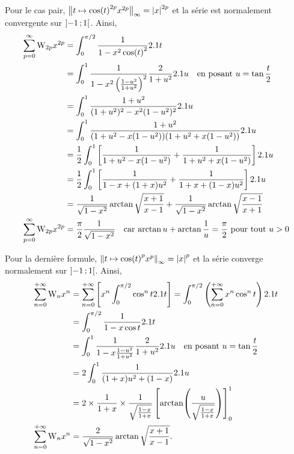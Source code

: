 \begin{solution}
\begin{reponses}
\item Pour le cas pair, $\big\Vert t \mapsto \cos(t)^{2p} x^{2p} \big\Vert_{\infty} = \abs{x}^{2p}$ et la série est normalement convergente sur $\left]-1\,;1\right[$. Ainsi,
\begin{align*}
\sum_{p=0}^\infty \mathrm{W}_{2p} x^{2p} &= \int_0^{\pi/2} \frac{1}{1 - x^2 \cos(t)^2} 2.1 t \\
&= \int_0^1 \frac{1}{1 - x^2 \left(\frac{1-u^2}{1+u^2}\right)^2} \frac{2}{1 + u^2} 2.1 u \quad \text{en posant } u = \tan \frac{t}{2} \\
&= \int_0^1 \frac{1 + u^2}{(1 + u^2)^2 - x^2(1-u^2)^2} 2.1 u \\
&= \int_0^1 \frac{1 + u^2}{(1 + u^2 - x(1-u^2))(1 + u^2 + x(1-u^2))} 2.1 u \\
&= \frac{1}{2} \int_0^1 \left[ \frac{1}{1 + u^2 - x(1-u^2)} + \frac{1}{1 + u^2 + x(1-u^2)}\right] 2.1 u \\
&= \frac{1}{2} \int_0^1 \left[\frac{1}{1 - x + (1+x)u^2} + \frac{1}{1 + x + (1-x)u^2} \right] 2.1 u \\
&= \frac{1}{\sqrt{1-x^2}} \arctan \sqrt{\frac{x+1}{x-1}} + \frac{1}{\sqrt{1-x^2}} \arctan \sqrt{\frac{x-1}{x+1}}\\
\sum_{p=0}^\infty \mathrm{W}_{2p} x^{2p} &= \frac{\pi}{2} \frac{1}{\sqrt{1-x^2}} \quad \text{car $\arctan u + \arctan \frac{1}{u} = \frac{\pi}{2}$ pour tout $u > 0$}
\end{align*}

\item Pour la dernière formule, $\norm{t \mapsto \cos(t)^p x^p}_{\infty} = \left| x \right|^p$ et la série converge normalement sur $\left]-1\,;1\right[$. Ainsi,
\begin{align*}
\sum_{n=0}^{+ \infty} \mathrm{W}_n x^n &= \sum_{n=0}^{+ \infty} \left[ x^n \int_0^{\pi/2} \cos^n t 2.1 t \right] = \int_0^{\pi/2} \left( \sum_{n=0}^{+\infty} x^n \cos^n t \right) 2.1 t \\
&=\int_0^{\pi/2} \frac{1}{1 - x \cos t} 2.1 t \\
&= \int_0^1 \frac{1}{1 - x \frac{1-u^2}{1+u^2}} \frac{2}{1 + u^2} 2.1 u \quad \text{en posant } u = \tan \frac{t}{2} \\
&= 2 \int_0^1 \frac{1}{(1+x)u^2 + (1-x)} 2.1 u \\
&= 2 \times \frac{1}{1+x} \times \frac{1}{\sqrt{\frac{1-x}{1+x}}} \left[ \arctan\mathopen{}\left( \frac{u}{\sqrt{\frac{1-x}{1+x}}} \right) \right]_0^1 \\
\sum_{n=0}^{+ \infty} \mathrm{W}_n x^n &= \frac{2}{\sqrt{1-x^2}} \arctan \sqrt{\frac{x+1}{x-1}}.
\end{align*}
\end{reponses}
\end{solution}

